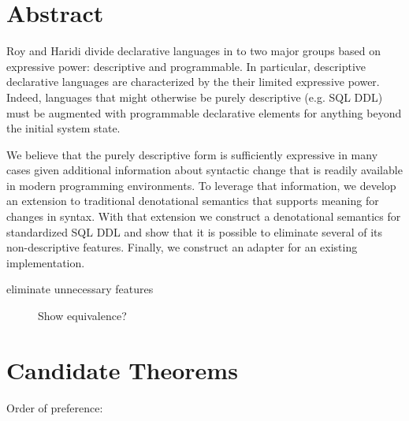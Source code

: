 \documentclass[12pt]{article}
\begin{document}
\section{Abstract}

Roy and Haridi \cite{RoyH2004} divide declarative languages in to two major groups based on expressive power: descriptive and programmable. In particular, descriptive declarative languages are characterized by the their limited expressive power. Indeed, languages that might otherwise be purely descriptive (e.g. SQL DDL) must be augmented with programmable declarative elements for anything beyond the initial system state.

We believe that the purely descriptive form is sufficiently expressive in many cases given additional information about syntactic change that is readily available in modern programming environments. To leverage that information, we develop an extension to traditional denotational semantics that supports meaning for changes in syntax. With that extension we construct a denotational semantics for standardized SQL DDL and show that it is possible to eliminate several of its non-descriptive features. Finally, we construct an adapter for an existing implementation.

\begin{description}
  \item[eliminate unnecessary features] Show equivalence?
\end{description}

\section{Candidate Theorems}
\label{sec:theorems}

Order of preference:
\end{document}
